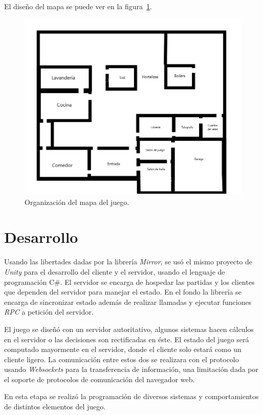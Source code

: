 El diseño del mapa se puede ver en la figura~\ref{fig:mapa_juego}.
\begin{figure}[H]
    \centering
    \includegraphics[width=1\linewidth]{images/MapaJuego.png}
    \caption{Organización del mapa del juego.}
    \label{fig:mapa_juego}
\end{figure}

\section{Desarrollo}
Usando las libertades dadas por la librería \textit{Mirror}, se usó el mismo proyecto de \textit{Unity} para el desarrollo del cliente y el servidor, usando el lenguaje de programación C\#. El servidor se encarga de hospedar las partidas y los clientes que dependen del servidor para manejar el estado. En el fondo la librería se encarga de sincronizar estado además de realizar llamadas y ejecutar funciones \textit{RPC} a petición del servidor.

El juego se diseñó con un servidor autoritativo, algunos sistemas hacen cálculos en el servidor o las decisiones son rectificadas en éste. El estado del juego será computado mayormente en el servidor, donde el cliente solo estará como un cliente ligero. La comunicación entre estos dos se realizara con el protocolo usando \textit{Websockets} para la transferencia de información, una limitación dada por el soporte de protocolos de comunicación del navegador web.

En esta etapa se realizó la programación de diversos sistemas y comportamientos de distintos elementos del juego.

